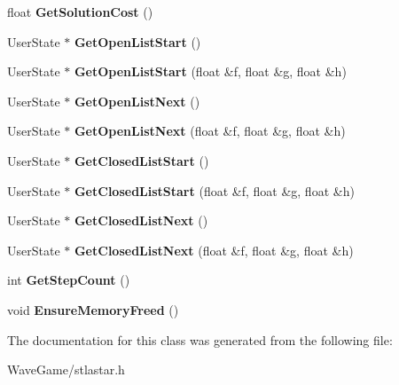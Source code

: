 \begin{DoxyCompactItemize}
\item 
\mbox{\label{class_a_star_search_a932ded5bf8ffffb8d9fb46e07badc3e0}} 
float {\bfseries Get\+Solution\+Cost} ()
\item 
\mbox{\label{class_a_star_search_ad9233df06b277efb6151c6ec807434ee}} 
User\+State $\ast$ {\bfseries Get\+Open\+List\+Start} ()
\item 
\mbox{\label{class_a_star_search_a5041617259f25e45f47cfb4457461fb7}} 
User\+State $\ast$ {\bfseries Get\+Open\+List\+Start} (float \&f, float \&g, float \&h)
\item 
\mbox{\label{class_a_star_search_aee89a6b3b8e605d3a942e27846ee46e4}} 
User\+State $\ast$ {\bfseries Get\+Open\+List\+Next} ()
\item 
\mbox{\label{class_a_star_search_a3ff7cc6d725c862f00e2adecd98d9662}} 
User\+State $\ast$ {\bfseries Get\+Open\+List\+Next} (float \&f, float \&g, float \&h)
\item 
\mbox{\label{class_a_star_search_ac587c436e7f4458a02b5a214d5ac005e}} 
User\+State $\ast$ {\bfseries Get\+Closed\+List\+Start} ()
\item 
\mbox{\label{class_a_star_search_acf248c4f1beb0320f85850ec95c4782a}} 
User\+State $\ast$ {\bfseries Get\+Closed\+List\+Start} (float \&f, float \&g, float \&h)
\item 
\mbox{\label{class_a_star_search_a4fa7ad2245e527b6999fdf99710889ae}} 
User\+State $\ast$ {\bfseries Get\+Closed\+List\+Next} ()
\item 
\mbox{\label{class_a_star_search_a9076c0338c6e65c7dd917c0e320e09a6}} 
User\+State $\ast$ {\bfseries Get\+Closed\+List\+Next} (float \&f, float \&g, float \&h)
\item 
\mbox{\label{class_a_star_search_a4b23e8ba7ffe537c3ff61d875eec669f}} 
int {\bfseries Get\+Step\+Count} ()
\item 
\mbox{\label{class_a_star_search_aad02aa16beecec7f509d4f5e4d6b59fa}} 
void {\bfseries Ensure\+Memory\+Freed} ()
\end{DoxyCompactItemize}


The documentation for this class was generated from the following file\+:\begin{DoxyCompactItemize}
\item 
Wave\+Game/stlastar.\+h\end{DoxyCompactItemize}
